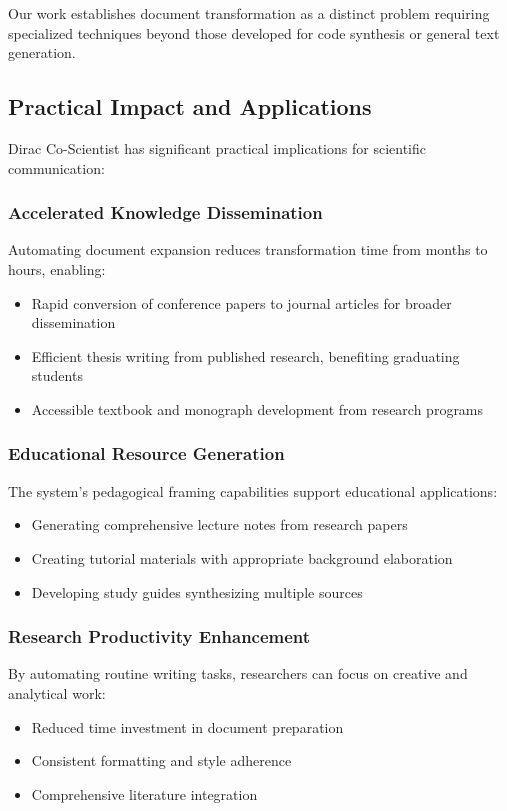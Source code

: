 \documentclass{ieeeaccess}
\begin{document}
Our work establishes document transformation as a distinct problem requiring specialized techniques beyond those developed for code synthesis or general text generation.

\subsection{Practical Impact and Applications}

Dirac Co-Scientist has significant practical implications for scientific communication:

\subsubsection{Accelerated Knowledge Dissemination}

Automating document expansion reduces transformation time from months to hours, enabling:
\begin{itemize}
\item Rapid conversion of conference papers to journal articles for broader dissemination
\item Efficient thesis writing from published research, benefiting graduating students
\item Accessible textbook and monograph development from research programs
\end{itemize}

\subsubsection{Educational Resource Generation}

The system's pedagogical framing capabilities support educational applications:
\begin{itemize}
\item Generating comprehensive lecture notes from research papers
\item Creating tutorial materials with appropriate background elaboration
\item Developing study guides synthesizing multiple sources
\end{itemize}

\subsubsection{Research Productivity Enhancement}

By automating routine writing tasks, researchers can focus on creative and analytical work:
\begin{itemize}
\item Reduced time investment in document preparation
\item Consistent formatting and style adherence
\item Comprehensive literature integration
\end{itemize}
\end{document}
